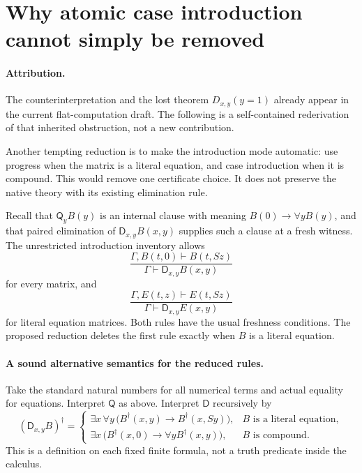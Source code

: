 \section{Why atomic case introduction cannot simply be removed}
\label{app:forced-progress-obstruction}

\paragraph{Attribution.} The counterinterpretation and the lost theorem $D_{x,y}(y=1)$ already appear in the current flat-computation draft. The following is a self-contained rederivation of that inherited obstruction, not a new contribution.~\cite{flat}

Another tempting reduction is to make the introduction mode automatic:
use progress when the matrix is a literal equation, and case introduction
when it is compound.  This would remove one certificate choice.  It does
not preserve the native theory with its existing elimination rule.

Recall that $\mathsf Q_yB(y)$ is an internal clause with meaning
$B(0)\to\forall yB(y)$, and that paired elimination of
$\mathsf D_{x,y}B(x,y)$ supplies such a clause at a fresh witness.
The unrestricted introduction inventory allows
\[
 \frac{\Gamma,B(t,0)\vdash B(t,Sz)}
      {\Gamma\vdash\mathsf D_{x,y}B(x,y)}
\]
for every matrix, and
\[
 \frac{\Gamma,E(t,z)\vdash E(t,Sz)}
      {\Gamma\vdash\mathsf D_{x,y}E(x,y)}
\]
for literal equation matrices.  Both rules have the usual freshness
conditions.  The proposed reduction deletes the first rule exactly when
$B$ is a literal equation.

\paragraph{A sound alternative semantics for the reduced rules.}
Take the standard natural numbers for all numerical terms and actual
equality for equations.  Interpret $\mathsf Q$ as above.  Interpret
$\mathsf D$ recursively by
\[
 (\mathsf D_{x,y}B)^\dagger=
 \begin{cases}
 \exists x\,\forall y\,
   \bigl(B^\dagger(x,y)\to B^\dagger(x,Sy)\bigr),
       & B\text{ is a literal equation},\\[2pt]
 \exists x\,
   \bigl(B^\dagger(x,0)\to\forall yB^\dagger(x,y)\bigr),
       & B\text{ is compound}.
 \end{cases}
\]
This is a definition on each fixed finite formula, not a truth predicate
inside the calculus.

